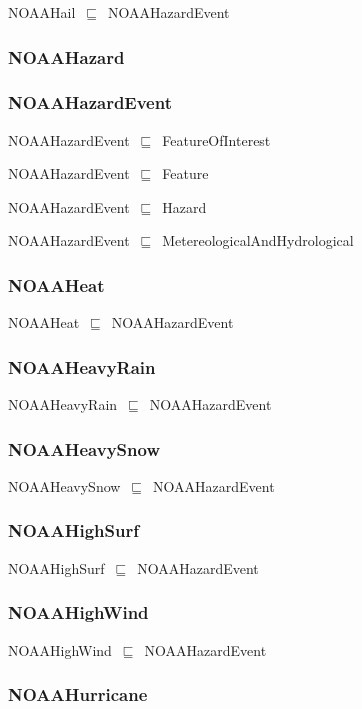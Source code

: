 \documentclass{article}
\begin{document}
NOAAHail~\ensuremath{\sqsubseteq}~NOAAHazardEvent~

\subsubsection*{NOAAHazard}

\subsubsection*{NOAAHazardEvent}

NOAAHazardEvent~\ensuremath{\sqsubseteq}~FeatureOfInterest~

NOAAHazardEvent~\ensuremath{\sqsubseteq}~Feature~

NOAAHazardEvent~\ensuremath{\sqsubseteq}~Hazard~

NOAAHazardEvent~\ensuremath{\sqsubseteq}~MetereologicalAndHydrological~

\subsubsection*{NOAAHeat}

NOAAHeat~\ensuremath{\sqsubseteq}~NOAAHazardEvent~

\subsubsection*{NOAAHeavyRain}

NOAAHeavyRain~\ensuremath{\sqsubseteq}~NOAAHazardEvent~

\subsubsection*{NOAAHeavySnow}

NOAAHeavySnow~\ensuremath{\sqsubseteq}~NOAAHazardEvent~

\subsubsection*{NOAAHighSurf}

NOAAHighSurf~\ensuremath{\sqsubseteq}~NOAAHazardEvent~

\subsubsection*{NOAAHighWind}

NOAAHighWind~\ensuremath{\sqsubseteq}~NOAAHazardEvent~

\subsubsection*{NOAAHurricane}
\end{document}
